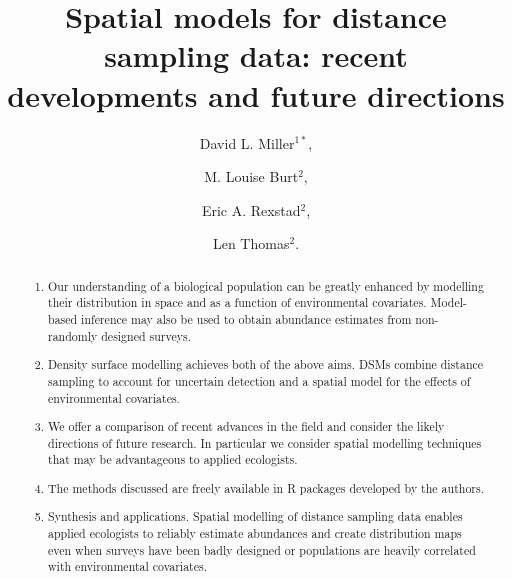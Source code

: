 \documentclass[a4paper,12pt]{article}
\title{Spatial models for distance sampling data: recent developments and future directions}
\author{
David L. Miller$^{1*}$, \and
M. Louise Burt$^{2}$, \and
Eric A. Rexstad$^{2}$, \and 
Len Thomas$^{2}$.}
\begin{document}
\maketitle

\begin{abstract}
  \noindent 
  

\begin{enumerate}
	\item Our understanding of a biological population can be greatly enhanced by modelling their distribution in space and as a function of environmental covariates. Model-based inference may also be used to obtain abundance estimates from non-randomly designed surveys. 
	\item Density surface modelling achieves both of the above aims. DSMs combine distance sampling to account for uncertain detection and a spatial model for the effects of environmental covariates.
	\item We offer a comparison of recent advances in the field and consider the likely directions of future research. In particular we consider spatial modelling techniques that may be advantageous to applied ecologists.
	\item The methods discussed are freely available in \textsf{R} packages developed by the authors.
	\item Synthesis and applications. Spatial modelling of distance sampling data enables applied ecologists to reliably estimate abundances and create distribution maps even when surveys have been badly designed or populations are heavily correlated with environmental covariates.
\end{enumerate}
 

\end{abstract}
\end{document}
